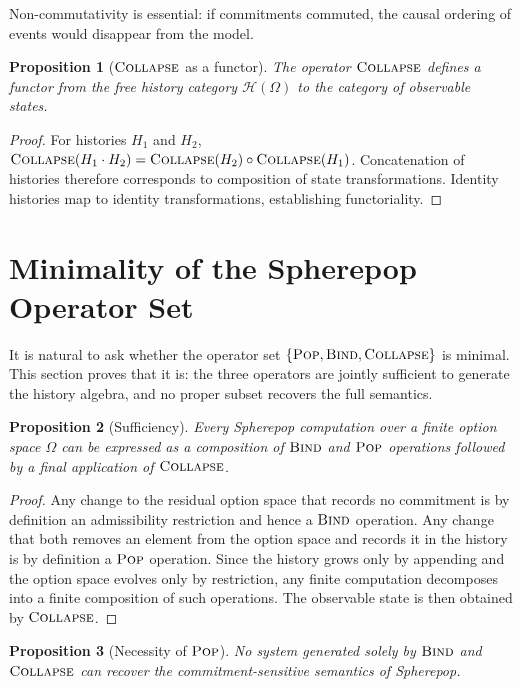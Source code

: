\documentclass[12pt]{article}
\newtheorem{proposition}{Proposition}[section]
\newcommand{\Pop}{\operatorname{\textsc{Pop}}}
\newcommand{\Bind}{\operatorname{\textsc{Bind}}}
\newcommand{\Collapse}{\operatorname{\textsc{Collapse}}}
\newcommand{\History}{\mathcal{H}}
\newcommand{\Option}{\Omega}
\newcommand{\Append}{\mathbin{\cdot}}
\begin{document}
Non-commutativity is essential: if commitments commuted, the causal ordering of events would disappear from the model.

\begin{proposition}[$\Collapse$ as a functor]
The operator $\Collapse$ defines a functor from the free history category $\History(\Option)$ to the category of observable states.
\end{proposition}

\begin{proof}
For histories $H_1$ and $H_2$, $\Collapse(H_1 \Append H_2) = \Collapse(H_2) \circ \Collapse(H_1)$. Concatenation of histories therefore corresponds to composition of state transformations. Identity histories map to identity transformations, establishing functoriality.
\end{proof}

\section{Minimality of the Spherepop Operator Set}
\label{sec:minimality}

It is natural to ask whether the operator set $\{\Pop, \Bind, \Collapse\}$ is minimal. This section proves that it is: the three operators are jointly sufficient to generate the history algebra, and no proper subset recovers the full semantics.

\begin{proposition}[Sufficiency]
Every Spherepop computation over a finite option space $\Option$ can be expressed as a composition of $\Bind$ and $\Pop$ operations followed by a final application of $\Collapse$.
\end{proposition}

\begin{proof}
Any change to the residual option space that records no commitment is by definition an admissibility restriction and hence a $\Bind$ operation. Any change that both removes an element from the option space and records it in the history is by definition a $\Pop$ operation. Since the history grows only by appending and the option space evolves only by restriction, any finite computation decomposes into a finite composition of such operations. The observable state is then obtained by $\Collapse$.
\end{proof}

\begin{proposition}[Necessity of $\Pop$]
No system generated solely by $\Bind$ and $\Collapse$ can recover the commitment-sensitive semantics of Spherepop.
\end{proposition}
\end{document}
